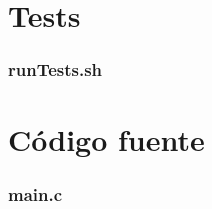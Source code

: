 \section{Tests}\label{appendix_tests}

\subsubsection{runTests.sh}\label{app_run_tests}


\clearpage
\section{Código fuente}\label{appendix_codigo_fuente}

\subsubsection{main.c}\label{app_main}

\clearpage


